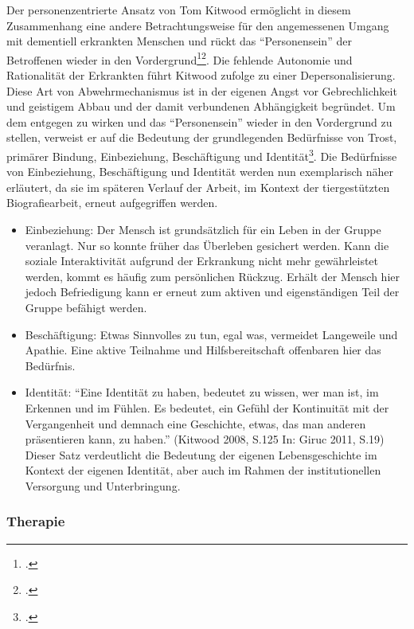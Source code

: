 Der personenzentrierte Ansatz von Tom Kitwood ermöglicht in diesem Zusammenhang eine andere Betrachtungsweise für den angemessenen Umgang mit dementiell erkrankten Menschen und rückt das "`Personensein"' der Betroffenen wieder in den Vordergrund\footcite[17f]{Giruc2011}\footcite[67f]{o.A.2013}. Die fehlende Autonomie und Rationalität der Erkrankten führt Kitwood zufolge zu einer Depersonalisierung. Diese Art von  Abwehrmechanismus ist in der eigenen Angst vor Gebrechlichkeit und geistigem Abbau und der damit verbundenen Abhängigkeit begründet. Um dem entgegen zu wirken und das "`Personensein"' wieder in den Vordergrund zu stellen, verweist er auf die Bedeutung der grundlegenden Bedürfnisse von Trost, primärer Bindung, Einbeziehung, Beschäftigung und Identität\footcite[18f]{Giruc2011}. Die Bedürfnisse von Einbeziehung, Beschäftigung und Identität werden nun exemplarisch näher erläutert, da sie im späteren Verlauf der Arbeit, im Kontext der tiergestützten Biografiearbeit, erneut aufgegriffen werden.

\begin{itemize}
\item Einbeziehung: Der Mensch ist grundsätzlich für ein Leben in der Gruppe veranlagt. Nur so konnte früher das Überleben gesichert werden. Kann die soziale Interaktivität aufgrund der Erkrankung nicht mehr gewährleistet werden, kommt es häufig zum persönlichen Rückzug. Erhält der Mensch hier jedoch Befriedigung kann er erneut zum aktiven und eigenständigen Teil der Gruppe befähigt werden.
\item Beschäftigung: Etwas Sinnvolles zu tun, egal was, vermeidet Langeweile und Apathie. Eine aktive Teilnahme und Hilfsbereitschaft offenbaren hier das Bedürfnis.
\item Identität: "`Eine Identität zu haben, bedeutet zu wissen, wer man ist, im Erkennen und im Fühlen. Es bedeutet, ein Gefühl der Kontinuität mit der Vergangenheit und demnach eine Geschichte, etwas, das man anderen präsentieren kann, zu haben."' (Kitwood 2008, S.125 In: Giruc 2011, S.19) Dieser Satz verdeutlicht die Bedeutung der eigenen Lebensgeschichte im Kontext der eigenen Identität, aber auch im Rahmen der institutionellen Versorgung und Unterbringung.
\end{itemize}

\subsubsection{Therapie}
\label{sec:k2.2.4_Therapie}

